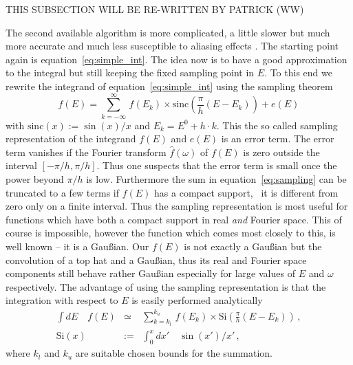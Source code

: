 THIS SUBSECTION WILL BE RE-WRITTEN BY PATRICK (WW)

The second available algorithm is more complicated, a little slower but
much more accurate and much less susceptible to aliasing effects
. The starting
point again is equation~\ref{eq:simple_int}. The idea now is to
 have a good approximation to the integral but still keeping the fixed sampling
point in $E$. To this end we rewrite the integrand of 
equation~\ref{eq:simple_int} using the sampling theorem~\cite{NRC,Rybicki}
\begin{equation}
\label{eq:sampling}
f(E)=\sum_{k=-\infty}^{\infty}\,f(E_k) 
\times \mathrm{sinc}\left(\frac{\pi}{h}(E-E_k)\right)+e(E)
\end{equation}
with $\mathrm{sinc}(x):=\sin(x)/x$ and $E_k=E^0+h\cdot k$. 
This the so called sampling 
representation of the integrand $f(E)$ and $e(E)$ is an error term.
The error term vanishes if the Fourier transform $\hat f(\omega)$ of $f(E)$
is zero outside the interval $[-\pi/h,\pi/h]$. Thus one suspects that
the error term is small once the power beyond $\pi/h$ is low. Furthermore
the sum in equation~\ref{eq:sampling} can be truncated to a few terms if
$f(E)$ has a compact support, \ie\ it is different from zero only 
on a finite interval. Thus the sampling representation is most useful
for functions which have both a compact support in real \emph{and} Fourier
space. This of course is impossible, however the function which comes
most closely to this, is well known -- it is a Gau\ss ian. Our $f(E)$ is not
exactly a Gau\ss ian  but the convolution of a top hat and a Gau\ss ian, thus
its real and Fourier space components still behave rather Gau\ss ian 
especially for large values of $E$ and $\omega$ respectively. The advantage of
using the sampling representation is that the integration with respect to $E$
is easily performed analytically
  \begin{eqnarray}
\label{eq:int_sampling}
\int dE \quad f(E)&\simeq& \sum_{k=k_{l}}^{k_{u}}\,f(E_k) 
\times \mathrm{Si}\left(\frac{\pi}{h}(E-E_k)\right)\,,\\
\mathrm{Si}(x)&:=&\int_{0}^x dx'\quad \sin(x')/x'\,,\nonumber 
\end{eqnarray}
where $k_l$ and $k_u$ are suitable chosen bounds for the summation.

